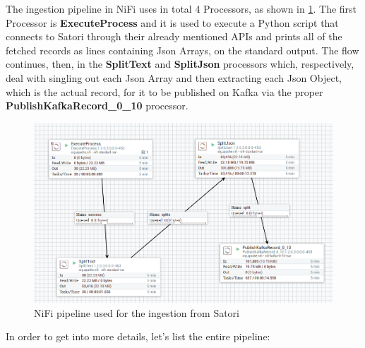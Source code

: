 The ingestion pipeline in NiFi uses in total 4 Processors, as shown in \ref{fig:nifipipeline}. The first Processor is \textbf{ExecuteProcess} and it is used to execute a Python script that connects to Satori through their already mentioned APIs and prints all of the fetched records as lines containing Json Arrays, on the standard output. The flow continues, then, in the \textbf{SplitText} and \textbf{SplitJson} processors which, respectively, deal with singling out each Json Array and then extracting each Json Object, which is the actual record, for it to be published on Kafka via the proper \textbf{PublishKafkaRecord\_0\_10} processor.

\begin{figure}[ph]
    \centering
    \includegraphics[width=0.7\linewidth]{Figures/nifipipeline}
    \caption{NiFi pipeline used for the ingestion from Satori}
    \label{fig:nifipipeline}
\end{figure}

In order to get into more details, let's list the entire pipeline:

